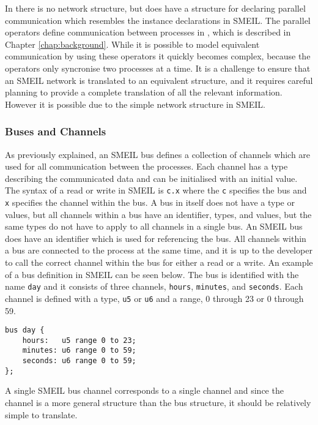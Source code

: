 In \cspm{} there is no network structure, but \cspm{} does have a structure for declaring parallel communication which resembles the instance declarations in SMEIL. The parallel operators define communication between processes in \cspm{}, which is described in Chapter \ref{chap:background}.
While it is possible to model equivalent communication by using these operators it quickly becomes complex, because the operators only syncronise two processes at a time. It is a challenge to ensure that an SMEIL network is translated to an equivalent \cspm{} structure, and it requires careful planning to provide a complete translation of all the relevant information. However it is possible due to the simple network structure in SMEIL.
\subsubsection{Buses and Channels}
\label{bus_and_channels}
As previously explained, an SMEIL bus defines a collection of channels which are used for all communication between the processes. Each channel has a type describing the communicated data and can be initialised with an initial value. The syntax of a read or write in SMEIL is \texttt{c.x} where the \texttt{c} specifies the bus and \texttt{x} specifies the channel within the bus.
A bus in itself does not have a type or values, but all channels within a bus have an identifier, types, and values, but the same types do not have to apply to all channels in a single bus. An SMEIL bus does have an identifier which is used for referencing the bus. All channels within a bus are connected to the process at the same time, and it is up to the developer to call the correct channel within the bus for either a read or a write.
An example of a bus definition in SMEIL can be seen below. The bus is identified with the name \texttt{day} and it consists of three channels, \texttt{hours}, \texttt{minutes}, and \texttt{seconds}. Each channel is defined with a type, \texttt{u5} or \texttt{u6} and a range, 0 through 23 or 0 through 59.
\begin{verbatim}
bus day {
    hours:   u5 range 0 to 23;
    minutes: u6 range 0 to 59;
    seconds: u6 range 0 to 59;
};
\end{verbatim}
A single SMEIL bus channel corresponds to a single \cspm{} channel and since the channel is a more general structure than the bus structure, it should be relatively simple to translate.
